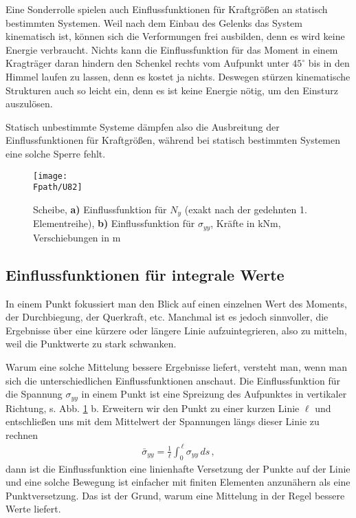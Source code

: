 Eine Sonderrolle spielen auch Einflussfunktionen f\"{u}r Kraftgr\"{o}{\ss}en an statisch bestimmten Systemen. Weil nach dem Einbau des Gelenks das System kinematisch ist, k\"{o}nnen sich die Verformungen frei ausbilden, denn es wird keine Energie verbraucht. Nichts kann die Einflussfunktion f\"{u}r das Moment in einem Kragtr\"{a}ger daran hindern den Schenkel rechts vom Aufpunkt unter $45^\circ$ bis \glq in den Himmel\grq{} laufen zu lassen, denn es kostet ja nichts. Deswegen st\"{u}rzen kinematische Strukturen auch so leicht ein, denn es ist keine Energie n\"{o}tig, um den Einsturz auszul\"{o}sen.

Statisch unbestimmte Systeme d\"{a}mpfen also die Ausbreitung der Einflussfunktionen f\"{u}r Kraftgr\"{o}{\ss}en, w\"{a}hrend bei statisch bestimmten Systemen eine solche Sperre fehlt.

\begin{figure}[tbp]
\centering
\if {} \sidecaption \fi
\texttt{[image: \\Fpath/U82]}
\caption{Scheibe, {\bf a)} Einflussfunktion f\"{u}r $N_y$ (exakt nach der gedehnten 1. Elementreihe), {\bf b)} Einflussfunktion f\"{u}r $\sigma_{yy}$, Kr\"{a}fte in kNm, Verschiebungen in m} \label{U82}
\end{figure}%
\vspace{-0.5cm}
{\textcolor{sectionTitleBlue}{\section{Einflussfunktionen f\"{u}r integrale Werte}}}

In einem Punkt fokussiert man den Blick auf einen einzelnen Wert des Moments, der Durchbiegung, der Querkraft, etc. Manchmal ist es jedoch sinnvoller, die Ergebnisse \"{u}ber eine k\"{u}rzere oder l\"{a}ngere Linie aufzuintegrieren, also zu mitteln, weil die Punktwerte zu stark schwanken.

Warum eine solche Mittelung bessere Ergebnisse liefert, versteht man, wenn man sich die unterschiedlichen Einflussfunktionen anschaut. Die Einflussfunktion f\"{u}r die Spannung $\sigma_{yy}$ in einem Punkt ist eine Spreizung des Aufpunktes in vertikaler Richtung, s. Abb. \ref{U82} b. Erweitern wir den Punkt zu einer kurzen Linie $\ell$ und entschlie{\ss}en uns mit dem Mittelwert der Spannungen l\"{a}ngs dieser Linie zu rechnen
\begin{align}
\bar{\sigma}_{yy} = \frac{1}{\ell } \int_0^{\,\ell} \sigma_{yy}\,ds \,,
\end{align}
dann ist die Einflussfunktion eine linienhafte Versetzung der Punkte auf der Linie und eine solche Bewegung ist einfacher mit finiten Elementen anzun\"{a}hern als eine Punktversetzung. Das ist der Grund, warum eine Mittelung in der Regel bessere Werte liefert.


